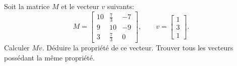 \begin{exercice}
Soit la matrice $M$ et le vecteur $v$ suivants:
\[
M=
\left[\begin{matrix}10 & \frac{7}{3} & -7\\9 & 10 & -9\\3 & \frac{7}{3} &
0\end{matrix}\right],\qquad
v=
\left[\begin{matrix}1\\3\\1\end{matrix}\right].
\]
Calculer $Mv$. Déduire la propriété de ce vecteur. Trouver tous les vecteurs
possédant la même propriété.
\end{exercice}


